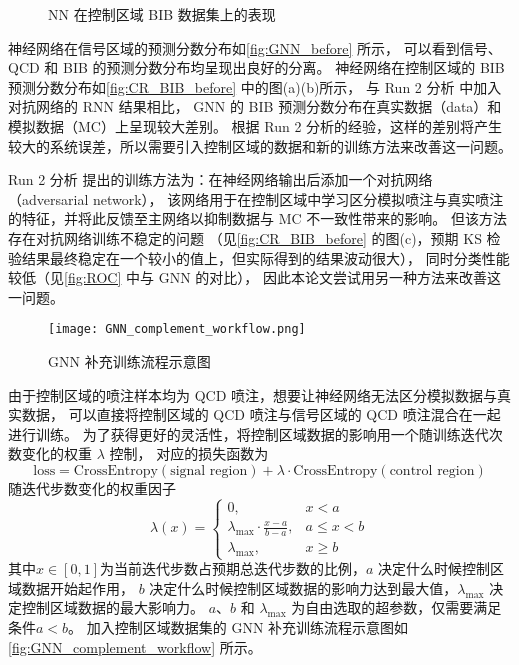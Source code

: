 \begin{figure}[ht]
    \centering
    \hfill
    \hfill
    \caption{NN 在控制区域 BIB 数据集上的表现}
    \label{fig:CR_BIB_before}
\end{figure}

神经网络在信号区域的预测分数分布如\autoref{fig:GNN_before} 所示，
可以看到信号、QCD 和 BIB 的预测分数分布均呈现出良好的分离。
神经网络在控制区域的 BIB 预测分数分布如\autoref{fig:CR_BIB_before} 中的图(a)(b)所示，
与 Run 2 分析\cite{ATLAS:2022zhj} 中加入对抗网络的 RNN 结果相比，
GNN 的 BIB 预测分数分布在真实数据（data）和模拟数据（MC）上呈现较大差别。
根据 Run 2 分析的经验，这样的差别将产生较大的系统误差，所以需要引入控制区域的数据和新的训练方法来改善这一问题。

Run 2 分析\cite{ATLAS:2022zhj} 提出的训练方法为：在神经网络输出后添加一个对抗网络（adversarial network），
该网络用于在控制区域中学习区分模拟喷注与真实喷注的特征，并将此反馈至主网络以抑制数据与 MC 不一致性带来的影响。
但该方法存在对抗网络训练不稳定的问题
（见\autoref{fig:CR_BIB_before} 的图(c)，预期 KS 检验结果最终稳定在一个较小的值上，但实际得到的结果波动很大），
同时分类性能较低（见\autoref{fig:ROC} 中与 GNN 的对比），
因此本论文尝试用另一种方法来改善这一问题。

\begin{figure}[ht]
    \centering
    \texttt{[image: GNN\_complement\_workflow.png]}
    \caption{GNN 补充训练流程示意图}
    \label{fig:GNN_complement_workflow}
\end{figure}

由于控制区域的喷注样本均为 QCD 喷注，想要让神经网络无法区分模拟数据与真实数据，
可以直接将控制区域的 QCD 喷注与信号区域的 QCD 喷注混合在一起进行训练。
为了获得更好的灵活性，将控制区域数据的影响用一个随训练迭代次数变化的权重 $\lambda$ 控制，
对应的损失函数为
\begin{equation} \label{eq:loss}
    \text{loss} = \text{CrossEntropy}(\text{signal region}) +
    \lambda \cdot \text{CrossEntropy}(\text{control region})
\end{equation}
随迭代步数变化的权重因子
\begin{equation}
    \lambda(x) = \begin{cases}
        0,                                    & x < a        \\
        \lambda_{\max} \cdot \frac{x-a}{b-a}, & a \leq x < b \\
        \lambda_{\max},                       & x \geq b
    \end{cases}
\end{equation}
其中$x \in [0, 1]$为当前迭代步数占预期总迭代步数的比例，$a$ 决定什么时候控制区域数据开始起作用，
$b$ 决定什么时候控制区域数据的影响力达到最大值，$\lambda_{\max}$ 决定控制区域数据的最大影响力。
$a$、$b$ 和 $\lambda_{\max}$ 为自由选取的超参数，仅需要满足条件$a<b$。
加入控制区域数据集的 GNN 补充训练流程示意图如\autoref{fig:GNN_complement_workflow} 所示。


